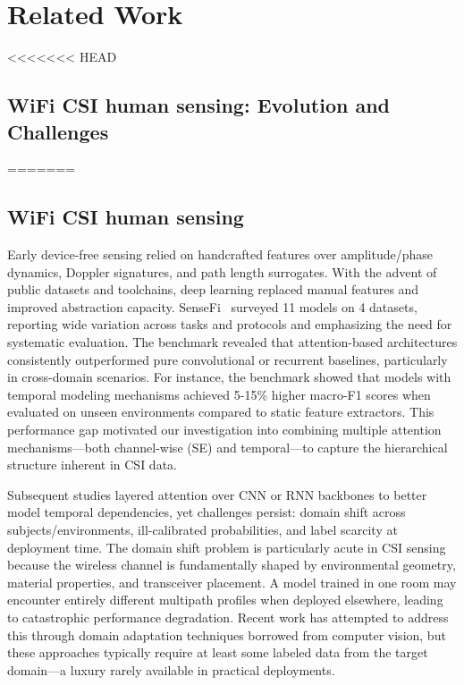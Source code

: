 \documentclass[journal]{IEEEtran}
\begin{document}
\section{Related Work}
<<<<<<< HEAD

\subsection{WiFi CSI human sensing: Evolution and Challenges}
=======
\subsection{WiFi CSI human sensing}
Early device-free sensing relied on handcrafted features over amplitude/phase dynamics, Doppler signatures, and path length surrogates. With the advent of public datasets and toolchains, deep learning replaced manual features and improved abstraction capacity. SenseFi~\cite{yang2023sensefi} surveyed 11 models on 4 datasets, reporting wide variation across tasks and protocols and emphasizing the need for systematic evaluation. The benchmark revealed that attention-based architectures consistently outperformed pure convolutional or recurrent baselines, particularly in cross-domain scenarios. For instance, the benchmark showed that models with temporal modeling mechanisms achieved 5-15\% higher macro-F1 scores when evaluated on unseen environments compared to static feature extractors. This performance gap motivated our investigation into combining multiple attention mechanisms—both channel-wise (SE) and temporal—to capture the hierarchical structure inherent in CSI data.

Subsequent studies layered attention over CNN or RNN backbones to better model temporal dependencies, yet challenges persist: domain shift across subjects/environments, ill-calibrated probabilities, and label scarcity at deployment time. The domain shift problem is particularly acute in CSI sensing because the wireless channel is fundamentally shaped by environmental geometry, material properties, and transceiver placement. A model trained in one room may encounter entirely different multipath profiles when deployed elsewhere, leading to catastrophic performance degradation. Recent work has attempted to address this through domain adaptation techniques borrowed from computer vision, but these approaches typically require at least some labeled data from the target domain—a luxury rarely available in practical deployments.
\end{document}
